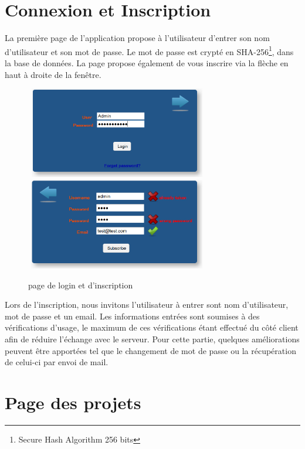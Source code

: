 \section{Connexion et Inscription}

La première page de l'application propose à l'utilisateur d'entrer son nom d'utilisateur et son mot de passe. Le mot de passe est crypté en SHA-256\footnote{Secure Hash Algorithm 256 bits}, dans la base de données. La page propose également de vous inscrire via la flèche en haut à droite de la fenêtre.

\begin{figure}[!h]
	\begin{center}
	\includegraphics[width=8cm,height=4cm]{login.png}	
	\includegraphics[width=8cm,height=4cm]{subscribe.png}
	\caption{page de login et d'inscription}
\end{center}
\end{figure}

Lors de l'inscription, nous invitons l'utilisateur à entrer sont nom d'utilisateur, mot de passe et un email. Les informations entrées sont soumises à des vérifications d'usage, le maximum de ces vérifications étant effectué du côté client afin de réduire l'échange avec le serveur.
\newline
\indent
Pour cette partie, quelques améliorations peuvent être apportées tel que le changement de mot de passe ou la récupération de celui-ci par envoi de mail.

\section{Page des projets}

